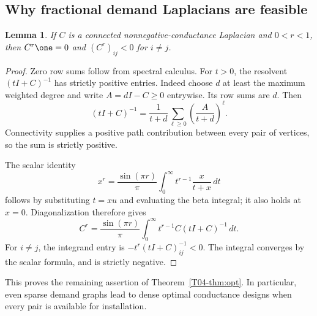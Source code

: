 \documentclass[11pt,a4paper]{article}
\newtheorem{lemma}[theorem]{Lemma}
\theoremstyle{definition}\newtheorem{definition}[theorem]{Definition}
\theoremstyle{remark}\newtheorem{remark}[theorem]{Remark}
\numberwithin{equation}{section}
\begin{document}
\subsection{Why fractional demand Laplacians are feasible}\label{T04-sec-3}
\begin{lemma}\label{T04-lem:fractional}
If $C$ is a connected nonnegative-conductance Laplacian and $0<r<1$, then $C^r\one=0$ and $(C^r)_{ij}<0$ for $i\ne j$.
\end{lemma}
\begin{proof}
Zero row sums follow from spectral calculus. For $t>0$, the resolvent $(tI+C)^{-1}$ has strictly positive entries. Indeed choose $d$ at least the maximum weighted degree and write $A=dI-C\ge0$ entrywise. Its row sums are $d$. Then
\[
 (tI+C)^{-1}=\frac1{t+d}\sum_{\ell\ge0}\left(\frac A{t+d}\right)^\ell.
\]
Connectivity supplies a positive path contribution between every pair of vertices, so the sum is strictly positive.

The scalar identity
\[
 x^r=\frac{\sin(\pi r)}\pi\int_0^\infty t^{r-1}\frac{x}{t+x}\,dt
\]
follows by substituting $t=xu$ and evaluating the beta integral; it also holds at $x=0$. Diagonalization therefore gives
\[
 C^r=\frac{\sin(\pi r)}\pi\int_0^\infty t^{r-1}C(tI+C)^{-1}\,dt.
\]
For $i\ne j$, the integrand entry is $-t^r(tI+C)^{-1}_{ij}<0$. The integral converges by the scalar formula, and is strictly negative.
\end{proof}
This proves the remaining assertion of Theorem~\ref{T04-thm:opt}. In particular, even sparse demand graphs lead to dense optimal conductance designs when every pair is available for installation.
\end{document}
